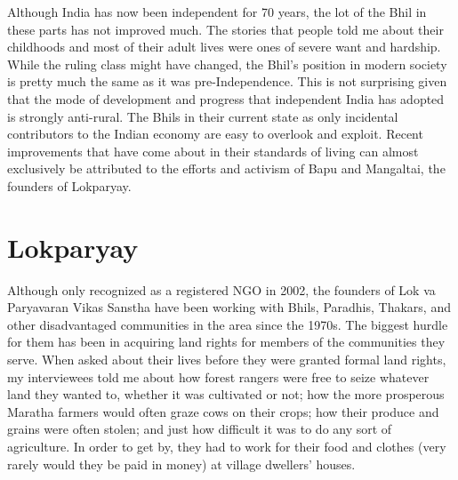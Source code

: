 \documentclass[report.tex]{subfiles}
\begin{document}
Although India has now been independent for 70 years, the lot of the Bhil in these parts has not improved much. The stories that people told me about their childhoods and most of their adult lives were ones of severe want and hardship. While the ruling class might have changed, the Bhil's position in modern society is pretty much the same as it was pre-Independence. This is not surprising given that the mode of development and progress that independent India has adopted is strongly anti-rural. The Bhils in their current state as only incidental contributors to the Indian economy are easy to overlook and exploit. Recent improvements that have come about in their standards of living can almost exclusively be attributed to the efforts and activism of Bapu and Mangaltai, the founders of Lokparyay.

\newpage

\section{Lokparyay}

Although only recognized as a registered NGO in 2002, the founders of Lok va Paryavaran Vikas Sanstha have been working with Bhils, Paradhis, Thakars, and other disadvantaged communities in the area since the 1970s. The biggest hurdle for them has been in acquiring land rights for members of the communities they serve. When asked about their lives before they were granted formal land rights, my interviewees told me about how forest rangers were free to seize whatever land they wanted to, whether it was cultivated or not; how the more prosperous Maratha farmers would often graze cows on their crops; how their produce and grains were often stolen; and just how difficult it was to do any sort of agriculture. In order to get by, they had to work for their food and clothes (very rarely would they be paid in money) at village dwellers' houses.
\end{document}
